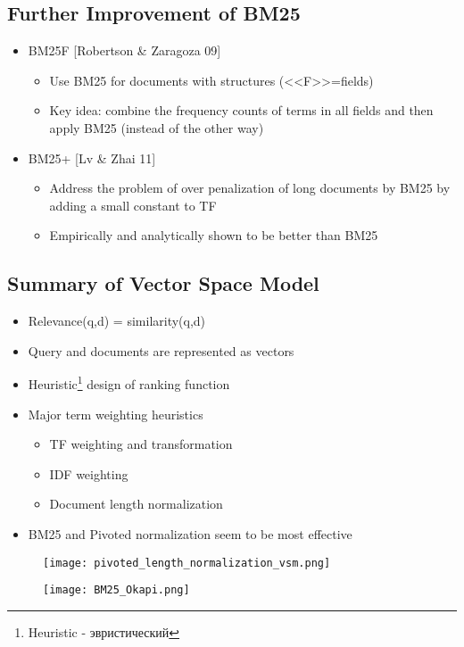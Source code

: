 \subsection{Further Improvement of BM25}
\begin{itemize}
\item BM25F [Robertson \& Zaragoza 09]
\begin{itemize}
\item Use BM25 for documents with structures (<<F>>=fields)
\item Key idea: combine the frequency counts of terms in all fields and then apply BM25 (instead of the other way)
\end{itemize}

\item BM25+ [Lv \& Zhai 11]
\begin{itemize}
\item Address the problem of over penalization of long documents
by BM25 by adding a small constant to TF
\item Empirically and analytically shown to be better than BM25
\end{itemize}
\end{itemize}


\subsection{Summary of Vector Space Model}
\begin{itemize}
\item Relevance(q,d) = similarity(q,d)
\item Query and documents are represented as vectors
\item Heuristic\footnote{Heuristic - эвристический} design of ranking function

\item Major term weighting heuristics 
\begin{itemize}
\item TF weighting and transformation 
\item IDF weighting
\item Document length normalization
\end{itemize}

\item BM25 and Pivoted normalization seem to be most effective
\end{itemize}

\begin{figure}[H]
    \centering
    \texttt{[image: pivoted\_length\_normalization\_vsm.png]}
\end{figure}
\begin{figure}[H]
    \centering
    \texttt{[image: BM25\_Okapi.png]}
\end{figure}


